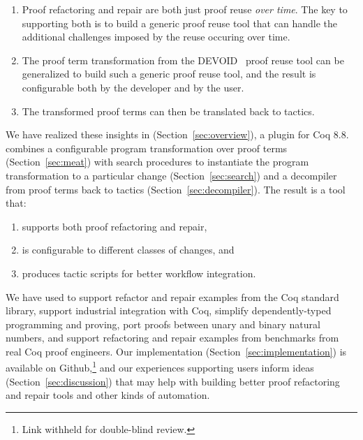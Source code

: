 \begin{enumerate}
\item Proof refactoring and repair are both just 
proof reuse %
\textit{over time}. The key to supporting both is to build a generic proof reuse
tool that can handle the additional challenges imposed by the reuse occuring over time. 
\item The proof term transformation from the \textsc{DEVOID}~\cite{Ringer2019} proof reuse tool can be generalized
to build such a generic proof reuse tool, and the result is configurable both by the developer and by the user.
\item The transformed proof terms can then be translated back to tactics.
\end{enumerate}

We have realized these insights in \toolname (Section~\ref{sec:overview}), a plugin for Coq 8.8. \toolname combines a
configurable program transformation over proof terms (Section~\ref{sec:meat})
with search procedures to instantiate the program transformation to a particular change (Section~\ref{sec:search})
and a decompiler from proof terms back to tactics (Section~\ref{sec:decompiler}).
The result is a tool that:

\begin{enumerate}
\item supports both proof refactoring and repair,
\item is configurable to different classes of changes, and
\item produces tactic scripts for better workflow integration.
\end{enumerate}
We have used \toolname to support refactor and repair examples from the Coq standard library,
support industrial integration with Coq,
simplify dependently-typed programming and proving,
port proofs between unary and binary natural numbers,
and support refactoring and repair examples from benchmarks from real Coq proof engineers.
Our implementation (Section~\ref{sec:implementation}) is available on Github,\footnote{Link withheld for double-blind review.}
and our experiences supporting users inform ideas (Section~\ref{sec:discussion}) that may help with building better
proof refactoring and repair tools and other kinds of automation.


